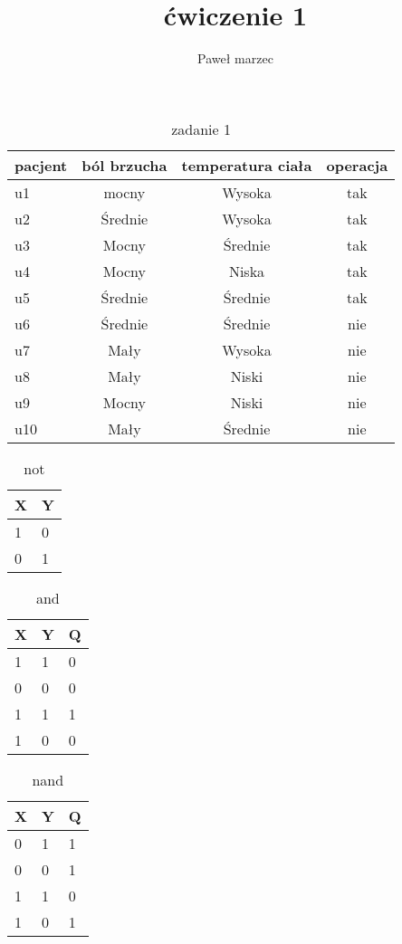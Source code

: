 \documentclass[a4paper]{article}
\title{ćwiczenie 1}
\author{Paweł marzec}
\begin{document}
\maketitle
\begin{table}[h]
\centering\caption{zadanie 1}
\begin{tabular}{|l| c c c}
\hline
\hline
pacjent &    ból brzucha &  temperatura ciała &  operacja \\
\hline
u1 & mocny&  Wysoka & tak  \\

u2 & Średnie&  Wysoka &  tak \\

u3 & Mocny&  Średnie & tak \\

u4 & Mocny& Niska &  tak \\

u5 & Średnie &Średnie & tak \\
u6 & Średnie&  Średnie &  nie \\
u7 & Mały &   Wysoka & nie \\
u8 & Mały &    Niski & nie \\
u9 & Mocny &   Niski &  nie \\
u10 & Mały &  Średnie & nie \\
\hline
\hline
\end{tabular}
\end{table}
\newpage
\begin{table}[h]
\centering\caption{not}
\begin{tabular}{|l|l|}
\hline
X&Y \\
\hline
1&0\\
\hline
0&1 \\
\hline

\end{tabular}
\end{table}
\begin{table}[h]
\centering\caption{and}
\begin{tabular}{|l|l|l|}
\hline
X&Y&Q \\
\hline
1&1&0\\
\hline
0&0&0 \\
\hline
1&1&1 \\
\hline
1&0&0 \\
\hline

\end{tabular}
\end{table}
\begin{table}[h]
\centering\caption{nand}
\begin{tabular}{|l|l|l|}
\hline
X&Y&Q \\
\hline
0&1&1\\
\hline
0&0&1 \\
\hline
1&1&0 \\
\hline
1&0&1 \\
\hline


\end{tabular}
\end{table}
\end{document}
